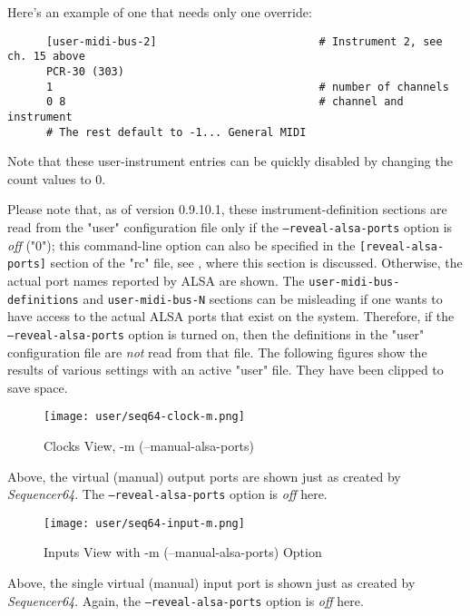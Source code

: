    Here's an example of one that needs only one override:

   \begin{verbatim}
      [user-midi-bus-2]                         # Instrument 2, see ch. 15 above
      PCR-30 (303)
      1                                         # number of channels
      0 8                                       # channel and instrument
      # The rest default to -1... General MIDI
   \end{verbatim}

   Note that these user-instrument entries can be quickly disabled by changing
   the count values to 0.

   Please note that, as of version 0.9.10.1, these instrument-definition
   sections are read from the "user" configuration file only if
   the \texttt{--reveal-alsa-ports} option is \textsl{off} ("0");
   this command-line option can also be specified in the
   \texttt{[reveal-alsa-ports]} section of the "rc" file,
   see , where this section is
   discussed.
   Otherwise, the actual port names reported by ALSA are shown.
   The \texttt{user-midi-bus-definitions} and \texttt{user-midi-bus-N} sections
   can be misleading if one wants to have access to the
   actual ALSA ports that exist on the system.
   Therefore, if the \texttt{--reveal-alsa-ports} option is turned on, then the
   definitions in the "user" configuration file are \textsl{not} read from that
   file.  The following figures show the results of various settings with an
   active "user" file.  They have been clipped to save space.

\begin{figure}[H]
   \centering 
   \texttt{[image: user/seq64-clock-m.png]}
   \caption{Clocks View, -m (--manual-alsa-ports)}
   \label{fig:seq64_clock_m}
\end{figure}

   Above, the virtual (manual) output ports are shown just as created by
   \textsl{Sequencer64}.
   The \texttt{--reveal-alsa-ports} option is \textsl{off} here.

\begin{figure}[H]
   \centering 
   \texttt{[image: user/seq64-input-m.png]}
   \caption{Inputs View with -m (--manual-alsa-ports) Option}
   \label{fig:seq64_input_m}
\end{figure}

   Above, the single virtual (manual) input port is shown just as created by
   \textsl{Sequencer64}.
   Again, the \texttt{--reveal-alsa-ports} option is \textsl{off} here.

